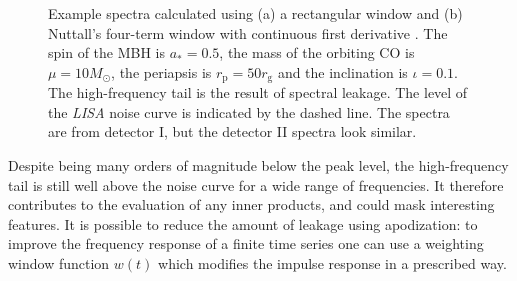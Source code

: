 \documentclass[useAMS,usedcolumn,usegraphicx,usenatbib]{mn2e}
\newcommand{\sub}[1]{\ensuremath{_\mathrm{#1}}}
\begin{document}
\begin{figure}
  \begin{center}
    \quad
    \caption{Example spectra calculated using (a) a rectangular window and (b) Nuttall's four-term window with continuous first derivative \citep{Nuttall1981}. The spin of the MBH is $a_\ast = 0.5$, the mass of the orbiting CO is $\mu = 10 M_\odot$, the periapsis is $r\sub{p} = 50 r\sub{g}$ and the inclination is $\iota = 0.1$. The high-frequency tail is the result of spectral leakage. The level of the \textit{LISA} noise curve is indicated by the dashed line. The spectra are from detector I, but the detector II spectra look similar.\label{fig:Windowing}}
  \end{center}
\end{figure}

Despite being many orders of magnitude below the peak level, the high-frequency tail is still well above the noise curve for a wide range of frequencies. It therefore contributes to the evaluation of any inner products, and could mask interesting features. It is possible to reduce the amount of leakage using apodization: to improve the frequency response of a finite time series one can use a weighting window function $w(t)$ which modifies the impulse response in a prescribed way.
\end{document}
